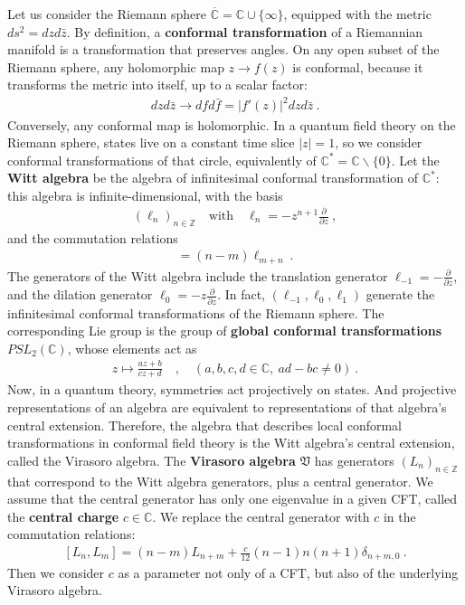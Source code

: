 \documentclass[12pt, a4paper]{article}
\newcommand{\myindex}[1]{\textbf{\boldmath #1}}
\begin{document}
Let us consider the Riemann sphere $\overline{\mathbb{C}}=\mathbb{C}\cup \{\infty\}$, equipped with the metric $ds^2 = dzd\bar z$. By definition, a \myindex{conformal transformation} of a Riemannian manifold is a transformation that preserves angles. On any open subset of the Riemann sphere, any holomorphic map $z\to f(z)$ is conformal, because it transforms the metric into itself, up to a scalar factor: 
\begin{align}
 dzd\bar z\to dfd\bar f = |f'(z)|^2 dzd\bar z\ .
\end{align}
Conversely, any conformal map is holomorphic. 
In a quantum field theory on the Riemann sphere, states live on a constant time slice $|z|=1$, so we consider conformal transformations of that circle, equivalently of $\mathbb{C}^*= \mathbb{C}\backslash \{0\}$.
Let the \myindex{Witt algebra} be the algebra of infinitesimal conformal transformation of $\mathbb{C}^*$: this algebra is infinite-dimensional, with the basis 
\begin{align}
 \left(\ell_n\right)_{n\in\mathbb{Z}}  \quad \text{with} \quad \ell_n = -z^{n+1}\frac{\partial}{\partial z}\ ,
 \label{lpz}
\end{align}
and the commutation relations 
\begin{align}
 [\ell_n,\ell_m] = (n-m)\ell_{m+n}\ .
\end{align}
The generators of the Witt algebra include the translation generator $\ell_{-1} = -\frac{\partial}{\partial z}$, and the dilation generator $\ell_0 = -z\frac{\partial}{\partial z}$. In fact, $(\ell_{-1},\ell_0,\ell_1)$ generate the infinitesimal conformal transformations of the Riemann sphere.
The corresponding Lie group is the group of \myindex{global conformal transformations} $PSL_2(\mathbb{C})$, whose elements act as 
\begin{align}
 z \mapsto \frac{az+b}{cz+d}\quad , \quad (a,b,c,d\in \mathbb{C},\ ad-bc\neq 0)\ .
 \label{abcd}
\end{align}
Now, in a quantum theory, symmetries act projectively on states. And projective representations of an algebra are equivalent to representations of that algebra's central extension. 
Therefore, the algebra that describes local conformal transformations in conformal field theory is the Witt algebra's central extension, called the Virasoro algebra. The \myindex{Virasoro algebra} $\mathfrak{V}$ has generators $(L_n)_{n\in\mathbb{Z}}$ that correspond to the Witt algebra generators, plus a central generator. We assume that the central generator has only one eigenvalue in a given CFT, called the \myindex{central charge} $c\in\mathbb{C}$. We replace the central generator with $c$ in the commutation relations:
 \begin{align}
  \boxed{[L_n,L_m] = (n-m)L_{n+m} +\frac{c}{12}(n-1)n(n+1)\delta_{n+m,0}} \ .
  \label{vir}
 \end{align}
Then we consider $c$ as a parameter not only of a CFT, but also of the underlying Virasoro algebra.
\end{document}
